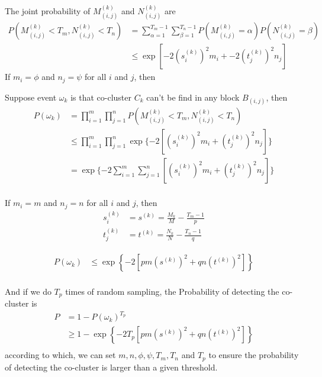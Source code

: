 \documentclass[12pt]{article}
\begin{document}
The joint probability of $M_{(i,j)}^{(k)}$ and $N_{(i,j)}^{(k)}$ are
\begin{align*}
    P(M_{(i,j)}^{(k)} < T_m, N_{(i,j)}^{(k)} < T_n) & = \sum_{\alpha=1}^{T_m-1} \sum_{\beta=1}^{T_n-1} P(M_{(i,j)}^{(k)} = \alpha) P(N_{(i,j)}^{(k)} = \beta) \\
                                                    & \le \exp[-2 (s_i^{(k)})^2 m_i + -2 (t_j^{(k)})^2 n_j]
\end{align*}
If $m_i = \phi$ and $n_j = \psi$ for all $i$ and $j$, then

Suppose event $\omega_k$ is that co-cluster $C_k$ can't be find in any block $B_{(i,j)}$, then
\begin{align*}
    P(\omega_k) & = \prod_{i=1}^m \prod_{j=1}^n P(M_{(i,j)}^{(k)} < T_m, N_{(i,j)}^{(k)} < T_n)                    \\
                & \le \prod_{i=1}^m \prod_{j=1}^n \exp\{-2 \left[ (s_i^{(k)})^2 m_i + (t_j^{(k)})^2 n_j \right] \} \\
                & = \exp\{-2 \sum_{i=1}^m \sum_{j=1}^n \left[ (s_i^{(k)})^2 m_i + (t_j^{(k)})^2 n_j \right] \}     \\
\end{align*}

If $m_i = m$ and $n_j = n$ for all $i$ and $j$, then
\begin{align*}
    s_i^{(k)} & = s^{(k)} = \frac{M_k}{M}-\frac{T_m-1}{p} \\
    t_j^{(k)} & = t^{(k)} = \frac{N_k}{N}-\frac{T_n-1}{q}
\end{align*}

\begin{align*}
    P(\omega_k) & \le \exp \left\{ -2 [pm (s^{(k)})^2 + qn (t^{(k)})^2] \right\} \\
\end{align*}


And if we do $T_p$ times of random sampling, the Probability of detecting the co-cluster is
\begin{align*}
    P & = 1 - P(\omega_k)^{T_p}                                              \\
      & \ge 1 - \exp \left\{ -2 T_p [pm (s^{(k)})^2 + qn (t^{(k)})^2] \right\} \\
\end{align*}
according to which, we can set $m, n, \phi, \psi, T_m, T_n$ and $T_p$ to ensure the probability of detecting the co-cluster is larger than a given threshold.
\end{document}
